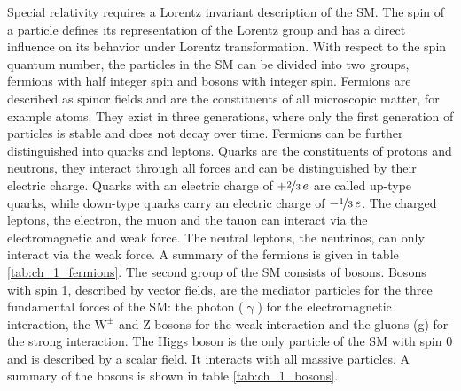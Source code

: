 Special relativity requires a Lorentz invariant description of the SM. The spin of a particle defines its representation of the Lorentz group and has a direct influence on its behavior under Lorentz transformation. With respect to the spin quantum number, the particles in the SM can be divided into two groups, fermions with half integer spin and bosons with integer spin. Fermions are described as spinor fields and are the constituents of all microscopic matter, for example atoms. They exist in three generations, where only the first generation of particles is stable and does not decay over time. Fermions can be further distinguished into quarks and leptons. Quarks are the constituents of protons and neutrons, they interact through all forces and can be distinguished by their electric charge. Quarks with an electric charge of $+\nicefrac{2}{3}\,\si{\elementarycharge}$ are called up-type quarks, while down-type quarks carry an electric charge of $-\nicefrac{1}{3}\,\si{\elementarycharge}$. The charged leptons, the electron, the muon and the tauon can interact via the electromagnetic and weak force. The neutral leptons, the neutrinos, can only interact via the weak force. A summary of the fermions is given in table \ref{tab:ch_1_fermions}. The second group of the SM consists of bosons. Bosons with spin 1, described by vector fields, are the mediator particles for the three fundamental forces of the SM: the photon ($\upgamma$) for the electromagnetic interaction, the $\textrm{W}^{\pm}$ and Z bosons for the weak interaction and the gluons (g) for the strong interaction. The Higgs boson is the only particle of the SM with spin 0 and is described by a scalar field. It interacts with all massive particles. A summary of the bosons is shown in table \ref{tab:ch_1_bosons}.\\

